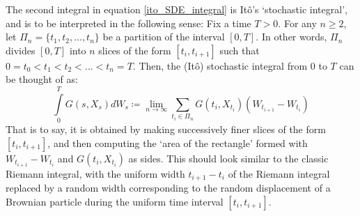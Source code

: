 The second integral in equation \eqref{ito_SDE_integral} is It\^o's `stochastic integral', and is to be interpreted in the following sense: Fix a time $T > 0$. For any $n\geq2$, let $\Pi_n = \{t_1,t_2,\ldots,t_n\}$ be a partition of the interval $[0,T]$. In other words, $\Pi_n$ divides $[0,T]$ into $n$ slices of the form $[t_i,t_{i+1}]$ such that $0 = t_0 < t_1 < t_2 < \ldots < t_n = T$. Then, the (It\^o) stochastic integral from $0$ to $T$ can be thought of as:
\begin{equation*}
\int\limits_{0}^{T} G(s,X_s)dW_s \coloneqq \lim_{n \to \infty} \sum\limits_{t_i \in \Pi_n}G(t_i,X_{t_i})(W_{t_{i+1}}-W_{t_i})  
\end{equation*}
That is to say, it is obtained by making successively finer slices of the form $[t_i,t_{i+1}]$, and then computing the `area of the rectangle' formed with $W_{t_{i+1}}-W_{t_i}$ and $G(t_i,X_{t_i})$ as sides. This should look similar to the classic Riemann integral, with the uniform width $t_{i+1}-t_i$ of the Riemann integral replaced by a random width corresponding to the random displacement of a Brownian particle during the uniform time interval $[t_i,t_{i+1}]$.

